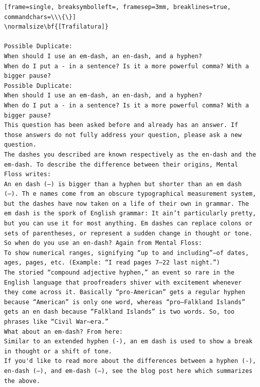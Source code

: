\documentclass{article}
\begin{document}
\begin{tiny}
\begin{Verbatim}[frame=single, breaksymbolleft=, framesep=3mm, breaklines=true, commandchars=\\\{\}]
\normalsize\bf{[Trafilatura]}

Possible Duplicate:
When should I use an em-dash, an en-dash, and a hyphen?
When do I put a - in a sentence? Is it a more powerful comma? With a bigger pause?
Possible Duplicate:
When should I use an em-dash, an en-dash, and a hyphen?
When do I put a - in a sentence? Is it a more powerful comma? With a bigger pause?
This question has been asked before and already has an answer. If those answers do not fully address your question, please ask a new question.
The dashes you described are known respectively as the en-dash and the em-dash. To describe the difference between their origins, Mental Floss writes:
An en dash (–) is bigger than a hyphen but shorter than an em dash (—). Th e names come from an obscure typographical measurement system, but the dashes have now taken on a life of their own in grammar. The em dash is the spork of English grammar: It ain’t particularly pretty, but you can use it for most anything. Em dashes can replace colons or sets of parentheses, or represent a sudden change in thought or tone.
So when do you use an en-dash? Again from Mental Floss:
To show numerical ranges, signifying “up to and including”—of dates, ages, pages, etc. (Example: “I read pages 7–22 last night.”)
The storied “compound adjective hyphen,” an event so rare in the English language that proofreaders shiver with excitement whenever they come across it. Basically “pro-American” gets a regular hyphen because “American” is only one word, whereas “pro–Falkland Islands” gets an en dash because “Falkland Islands” is two words. So, too phrases like “Civil War–era.”
What about an em-dash? From here:
Similar to an extended hyphen (-), an em dash is used to show a break in thought or a shift of tone.
If you'd like to read more about the differences between a hyphen (-), en-dash (–), and em-dash (—), see the blog post here which summarizes the above.
\end{Verbatim}
\end{tiny}
\end{document}
